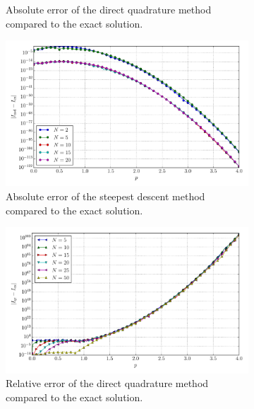\documentclass[a4paper,10pt]{article}
\begin{document}
\begin{figure}[ht!]
\begin{subfigure}[t]{0.5\linewidth}
    \caption{Absolute error of the direct quadrature method compared to the exact solution.}
    \label{fig:tp_2d_conv_p_88_88_err_qr}
  \end{subfigure}
  \begin{subfigure}[t]{0.5\linewidth}
    \includegraphics[width=\linewidth]{./plots/tp_2d_conv_p_(8,8)_(8,8)_err_nsd.pdf}
    \caption{Absolute error of the steepest descent method compared to the exact solution.}
    \label{fig:tp_2d_conv_p_88_88_err_nsd}
  \end{subfigure}
  \begin{subfigure}[t]{0.5\linewidth}
    \includegraphics[width=\linewidth]{./plots/tp_2d_conv_p_(8,8)_(8,8)_err_rel_qr.pdf}
    \caption{Relative error of the direct quadrature method compared to the exact solution.}
    \label{fig:tp_2d_conv_p_88_88_err_qr}
  \end{subfigure}
  \begin{subfigure}[t]{0.5\linewidth}

\end{subfigure}
\end{figure}
\end{document}
